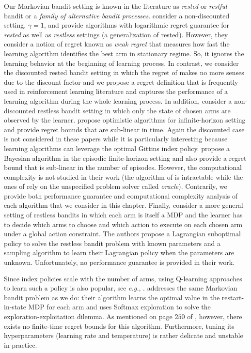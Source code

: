 Our Markovian bandit setting is known in the literature as \emph{rested} or \emph{restful} bandit or a \emph{family of alternative bandit processes}. \cite{tekin2012online} consider a non-discounted setting, $\gamma=1$, and provide algorithms with logarithmic regret guarantee for \emph{rested}  as well as  \emph{restless} settings (a generalization of rested).
However, they consider a notion of regret known as \emph{weak regret} that measures how fast the learning algorithm identifies the best arm in stationary regime. So, it ignores the learning behavior at the beginning of learning process.
In contrast, we consider the discounted rested bandit setting in which the regret of \cite{tekin2012online} makes no more senses due to the discount factor and we propose a regret definition that is frequently used in reinforcement learning literature and captures the performance of a learning algorithm during the whole learning process.
In addition, \cite{ortner2012regret, jung2019regret, wang2020restless} consider a non-discounted restless bandit setting in which only the state of chosen arms are observed by the learner. \cite{ortner2012regret, wang2020restless} propose optimistic algorithms for infinite-horizon setting and provide regret bounds that are sub-linear in time. Again the discounted case is not considered in these papers while it is particularly interesting  because learning algorithms can leverage the optimal Gittins index policy.
\cite{jung2019regret} propose a Bayesian algorithm in the episodic finite-horizon setting and also provide a regret bound that is sub-linear in the number of episodes. However, the computational complexity is not studied in their work (the algorithm of \cite{ortner2012regret} is intractable while the ones of \cite{jung2019regret, wang2020restless} rely on the unspecified problem solver called \emph{oracle}).
Contrarily, we provide both performance guarantee and computational complexity analysis of each algorithm that we consider in this chapter.
Finally, \cite{killian2021beyond} consider a more general setting of restless bandits in which each arm is itself a MDP and the learner has to decide which arms to choose and which action to execute on  each chosen arm under a  global action constraint. The authors propose a Lagrangian suboptimal policy to solve the restless bandit problem with known parameters and a sampling algorithm to learn their Lagrangian policy when the parameters are unknown. Unfortunately, no performance guarantee is provided in their work.

Since index policies  scale with the number of arms, using Q-learning approaches
to learn such a policy is also popular, see \emph{e.g.},
\cite{avrachenkov2022whittle,fu2019towards,duff1995q}. \cite{duff1995q} addresses the same Markovian bandit
problem as we do: their algorithm learns the optimal value in the
restart-in-state MDP \cite{katehakis1987multi} for each
arm and uses Softmax exploration to solve the exploration-exploitation
dilemma. As mentioned on page $250$ of
\cite{auer2002finite}, however, there exists no
finite-time regret bounds for this algorithm. Furthermore, tuning
its hyperparameters (learning rate and temperature) is rather delicate and
unstable  in practice. 

